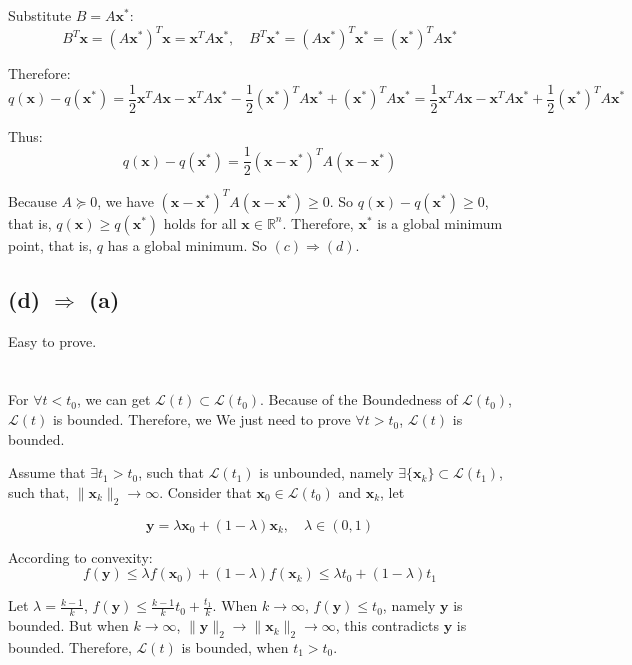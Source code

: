 \documentclass{article}
\begin{document}
Substitute $ B = A\mathbf{x}^* $:
$$
B^T\mathbf{x} = (A\mathbf{x}^*)^T\mathbf{x} = \mathbf{x}^TA\mathbf{x}^*, \quad B^T\mathbf{x}^* = (A\mathbf{x}^*)^T\mathbf{x}^* = (\mathbf{x}^*)^TA\mathbf{x}^*
$$

Therefore:
$$
q(\mathbf{x}) - q(\mathbf{x}^*) = \frac{1}{2}\mathbf{x}^TA\mathbf{x} - \mathbf{x}^TA\mathbf{x}^* - \frac{1}{2}(\mathbf{x}^*)^TA\mathbf{x}^* + (\mathbf{x}^*)^TA\mathbf{x}^* = \frac{1}{2}\mathbf{x}^TA\mathbf{x} - \mathbf{x}^TA\mathbf{x}^* + \frac{1}{2}(\mathbf{x}^*)^TA\mathbf{x}^*
$$

Thus:
$$
q(\mathbf{x}) - q(\mathbf{x}^*) = \frac{1}{2}(\mathbf{x} - \mathbf{x}^*)^TA(\mathbf{x} - \mathbf{x}^*)
$$

Because $ A \succeq 0 $, we have $ (\mathbf{x} - \mathbf{x}^*)^TA(\mathbf{x} - \mathbf{x}^*) \geq 0 $. So $ q(\mathbf{x}) - q(\mathbf{x}^*) \geq 0 $, that is, $ q(\mathbf{x}) \geq q(\mathbf{x}^*) $ holds for all $ \mathbf{x} \in \mathbb{R}^n $. Therefore, $ \mathbf{x}^* $ is a global minimum point, that is, $ q $ has a global minimum. So $ (c) \Rightarrow (d) $.

\subsection*{(d) $\Rightarrow$ (a)}
Easy to prove.

\section{}
For $\forall t < t_0$, we can get $\mathcal{L}(t)\subset \mathcal{L}(t_0)$. Because of the Boundedness of $\mathcal{L}(t_0)$, $\mathcal{L}(t)$ is bounded. Therefore, we We just need to prove $\forall t > t_0$, $\mathcal{L}(t)$ is bounded.
 
Assume that $\exists t_1 > t_0$, such that $\mathcal{L}(t_1)$ is unbounded, namely $\exists \{\mathbf{x}_k \} \subset \mathcal{L}(t_1)$, such that, $\| \mathbf{x}_k\|_2 \rightarrow \infty$. Consider that $\mathbf{x}_0 \in \mathcal{L}(t_0)$ and $\mathbf{x}_k$, let 
 
$$\mathbf{y}=\lambda\mathbf{x}_0+(1 - \lambda)\mathbf{x}_k , \quad \lambda\in(0,1) 
$$

According to convexity:
$$
f(\mathbf{y}) \leq\lambda f(\mathbf{x}_0) +(1-\lambda)f(\mathbf{x}_k)\leq\lambda t_0+(1 - \lambda)t_1
$$

Let $ \lambda = \frac{k-1}{k} $, $ f(\mathbf{y}) \leq \frac{k-1}{k}t_0+ \frac{t_1}{k}$. When $k \rightarrow \infty $, $f(\mathbf{y}) \leq t_0$, namely $\mathbf{y}$ is bounded. But when $k \rightarrow \infty $, $ \|\mathbf{y}\|_2 \rightarrow \| \mathbf{x}_k\|_2 \rightarrow \infty $, this contradicts $\mathbf{y}$ is bounded. Therefore, $\mathcal{L}(t)$ is bounded, when $t_1 > t_0$.
\end{document}
